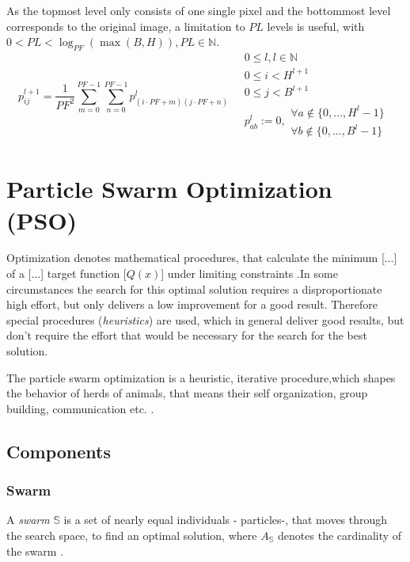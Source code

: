   \noindent As the topmost level only consists of one single pixel and the bottommost level corresponds to the original image, a limitation to $PL$ levels is useful, with $0 < PL < \log_{PF}{(\max(B,H))}, PL\in\mathbb{N}$.
  \begin{equation}\label{DefPyramidenformel} 
    p^{l+1}_{ij} = \frac{1}{PF^2}\sum\limits_{m=0}^{PF-1}\sum\limits_{n=0}^{PF-1}p^{l}_{(i\cdot PF+m)(j\cdot PF+n)}
    \quad
    \begin{array}{l}
       0\leq l, l\in\mathbb{N}\\
       0\leq i< H^{l+1}\\
       0\leq j< B^{l+1}\\
       p_{ab}^l:=0,
       \begin{array}{l}
         \forall a\notin\{0, ..., H^l-1\}\\
	 \forall b\notin\{0, ..., B^l-1\}
       \end{array}
    \end{array}
  \end{equation}

\section{Particle Swarm Optimization (PSO)}
  Optimization denotes \glqq mathematical procedures, that calculate the minimum [...] of a [...] target function [$Q(x)$] under limiting constraints \grqq\space\cite{Bartsch1997}.\linebreak In some circumstances the search for this optimal solution requires a disproportionate high effort, but only delivers a low improvement for a good result. Therefore special procedures (\textit{heuristics}) are used, which in general deliver good results, but don't require the effort that would be necessary for the search for the best solution.
  
  The particle swarm optimization  is a heuristic, iterative procedure,\linebreak which shapes the behavior of herds of animals, that means their self organization, group building, communication etc. \cite{Eberhart2001}.

\subsection{Components}
\subsubsection{Swarm}
  A \textit{swarm} $\mathbb{S}$ is a set of nearly equal individuals - particles-, that moves through the search space, to find an optimal solution, where $A_\mathbb{S}$ denotes the cardinality of the swarm \cite{Omran2005}.

